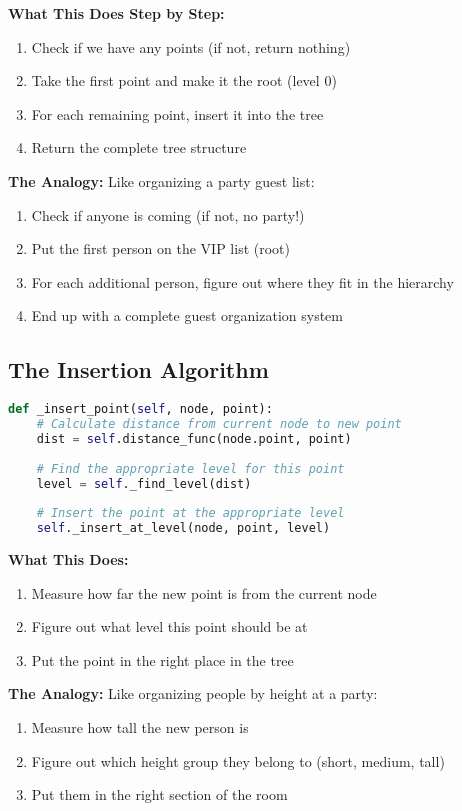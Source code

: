 \documentclass[12pt]{article}
\begin{document}
\textbf{What This Does Step by Step:}
\begin{enumerate}
    \item Check if we have any points (if not, return nothing)
    \item Take the first point and make it the root (level 0)
    \item For each remaining point, insert it into the tree
    \item Return the complete tree structure
\end{enumerate}

\textbf{The Analogy:} Like organizing a party guest list:
\begin{enumerate}
    \item Check if anyone is coming (if not, no party!)
    \item Put the first person on the VIP list (root)
    \item For each additional person, figure out where they fit in the hierarchy
    \item End up with a complete guest organization system
\end{enumerate}

\subsection{The Insertion Algorithm}

\begin{lstlisting}[language=Python, basicstyle=\small]
def _insert_point(self, node, point):
    # Calculate distance from current node to new point
    dist = self.distance_func(node.point, point)
    
    # Find the appropriate level for this point
    level = self._find_level(dist)
    
    # Insert the point at the appropriate level
    self._insert_at_level(node, point, level)
\end{lstlisting}

\textbf{What This Does:}
\begin{enumerate}
    \item Measure how far the new point is from the current node
    \item Figure out what level this point should be at
    \item Put the point in the right place in the tree
\end{enumerate}

\textbf{The Analogy:} Like organizing people by height at a party:
\begin{enumerate}
    \item Measure how tall the new person is
    \item Figure out which height group they belong to (short, medium, tall)
    \item Put them in the right section of the room
\end{enumerate}
\end{document}
